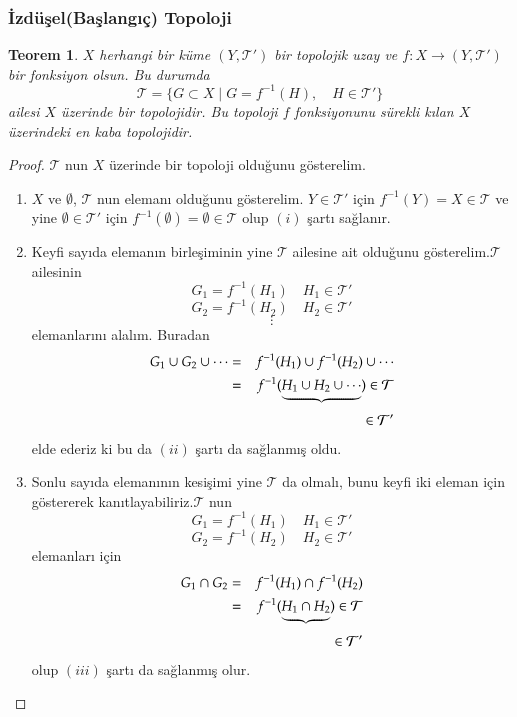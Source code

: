 \documentclass[11pt, a4paper]{article}
\newtheorem{theorem}{Teorem}
\begin{document}
\subsubsection*{\.{I}zd\"{u}\c{s}el(Ba\c{s}lang{\i}\c{c}) Topoloji}

\begin{theorem}
  $X$ herhangi bir k\"{u}me $(Y,\mathcal{T}')$ bir topolojik uzay ve $f:X\to (Y,\mathcal{T}')$ bir fonksiyon olsun. Bu durumda $$\mathcal{T} = \{ G\subset X\mid G=f^{-1}(H),\quad  H\in \mathcal{T}' \} $$ ailesi $X$ \"{u}zerinde bir topolojidir. Bu topoloji $f$ fonksiyonunu s\"{u}rekli k{\i}lan $X$ \"{u}zerindeki en kaba topolojidir.
\end{theorem}

\begin{proof}
$\mathcal{T}$ nun $X$ \"{u}zerinde bir topoloji oldu\u{g}unu g\"{o}sterelim.
\begin{enumerate}[label=(\roman*),leftmargin=1cm,series=lafter]
  \item $X$ ve $\emptyset$, $\mathcal{T}$ nun eleman{\i} oldu\u{g}unu g\"{o}sterelim. $Y\in \mathcal{T} '$ i\c{c}in $f^{-1}(Y)=X\in \mathcal{T} $ ve yine $\emptyset \in \mathcal{T} '$ i\c{c}in $f^{-1}(\emptyset)=\emptyset \in \mathcal{T}$ olup $(i)$ \c{s}art{\i} sa\u{g}lan{\i}r. 
   \item Keyfi say{\i}da eleman{\i}n birle\c{s}iminin yine $\mathcal{T}$ ailesine ait oldu\u{g}unu g\"{o}sterelim.$\mathcal{T}$ ailesinin $$G_1=f^{-1}(H_1)\quad H_1\in \mathcal{T}'$$
 $$G_2=f^{-1}(H_2)\quad  H_2\in \mathcal{T}'$$ $$\vdots{}$$elemanlar{\i}n{\i} alal{\i}m.  Buradan
 \begin{eqnarray*}
   G_1\cup G_2\cup \cdots &=& f^{-1}(H_1)\cup f^{-1}(H_2)\cup \cdots\\
   &=& f^{-1}(\underbrace{H_1\cup H_2\cup \cdots})\in \mathcal{T} \\
   & &\hspace{14mm} \in \mathcal{T}'
 \end{eqnarray*}
elde ederiz ki bu da $(ii)$ \c{s}art{\i} da sa\u{g}lanm{\i}\c{s} oldu.

  \item Sonlu say{\i}da eleman{\i}n{\i}n kesi\c{s}imi yine $\mathcal{T}$ da olmal{\i}, bunu keyfi iki eleman i\c{c}in g\"{o}stererek kan{\i}tlayabiliriz.$\mathcal{T}$ nun $$G_1=f^{-1}(H_1) \quad H_1\in \mathcal{T}'$$ $$G_2=f^{-1}(H_2) \quad H_2\in \mathcal{T}' $$ elemanlar{\i} i\c{c}in
    \begin{eqnarray*}
      G_1\cap G_2&=&f^{-1}(H_1)\cap f^{-1}(H_2)\\
      &=&f^{-1}(\underbrace{H_1\cap H_2})\in \mathcal{T} \\
      & &\hspace{10mm} \in \mathcal{T}'
    \end{eqnarray*}
olup $(iii)$ \c{s}art{\i} da sa\u{g}lanm{\i}\c{s} olur.\\


\end{enumerate}
\end{proof}
\end{document}
